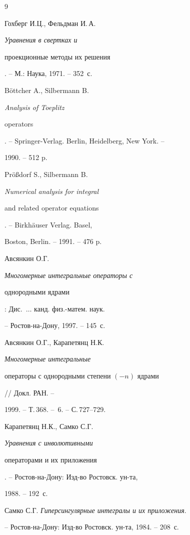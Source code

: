 \begin{thebibliography}{9}







Гохберг И.Ц., Фельдман И.\,А. {\it Уравнения в свертках и


проекционные методы их решения}. -- М.: Наука, 1971. -- 352~с.




B\"{o}ttcher A., Silbermann B. {\it Analysis of Toeplitz


operators}. -- Springer-Verlag. Berlin, Heidelberg, New York. --


1990. -- 512 p.




Pr\"o\ss{}dorf S., Silbermann B. {\it Numerical analysis for integral


and related operator equations}. -- Birkh\"auser Verlag. Basel,


Boston, Berlin. -- 1991. -- 476 p.




Авсянкин О.Г. {\it Многомерные интегральные операторы с


однородными ядрами}: Дис.~$\dotsc$ канд. физ.-матем. наук.


-- Ростов-на-Дону, 1997. -- 145~с.




Авсянкин О.Г., Карапетянц Н.К. {\it Многомерные интегральные


операторы с однородными степени $(-n)$ ядрами} // Докл. РАН. --


1999. -- Т.\,368. -- \No\,6. -- С.\,727--729.




Карапетянц Н.К., Самко С.Г. {\it Уравнения с инволютивными


операторами и их приложения}. -- Ростов-на-Дону: Изд-во Ростовск. ун-та,


1988. -- 192~с.




Самко С.Г. {\it Гиперсингулярные интегралы и их приложения}.


-- Ростов-на-Дону: Изд-во Ростовск. ун-та, 1984. -- 208~с.





\end{thebibliography}





\vskip 2cm












\label{end}














